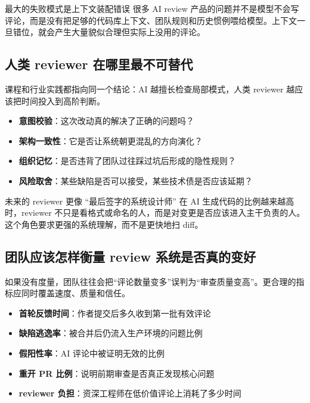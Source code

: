 \documentclass[a4paper]{article}
\begin{document}
\begin{warningbox}{最大的失败模式是上下文装配错误}
很多 AI review 产品的问题并不是模型不会写评论，而是没有把足够的代码库上下文、团队规则和历史惯例喂给模型。上下文一旦错位，就会产生大量貌似合理但实际上没用的评论。
\end{warningbox}

\subsection{人类 reviewer 在哪里最不可替代}

课程和行业实践都指向同一个结论：AI 越擅长检查局部模式，人类 reviewer 越应该把时间投入到高阶判断。

\begin{itemize}
    \item \textbf{意图校验}：这次改动真的解决了正确的问题吗？
    \item \textbf{架构一致性}：它是否让系统朝更混乱的方向演化？
    \item \textbf{组织记忆}：是否违背了团队过往踩过坑后形成的隐性规则？
    \item \textbf{风险取舍}：某些缺陷是否可以接受，某些技术债是否应该延期？
\end{itemize}

\begin{importantbox}{未来的 reviewer 更像 ``最后签字的系统设计师''}
在 AI 生成代码的比例越来越高时，reviewer 不只是看格式或命名的人，而是对变更是否应该进入主干负责的人。这个角色要求更强的系统理解，而不是更快地扫 diff。
\end{importantbox}

\subsection{团队应该怎样衡量 review 系统是否真的变好}

如果没有度量，团队往往会把``评论数量变多''误判为``审查质量变高''。更合理的指标应同时覆盖速度、质量和信任。

\begin{itemize}
    \item \textbf{首轮反馈时间}：作者提交后多久收到第一批有效评论
    \item \textbf{缺陷逃逸率}：被合并后仍流入生产环境的问题比例
    \item \textbf{假阳性率}：AI 评论中被证明无效的比例
    \item \textbf{重开 PR 比例}：说明前期审查是否真正发现核心问题
    \item \textbf{reviewer 负担}：资深工程师在低价值评论上消耗了多少时间
\end{itemize}
\end{document}
